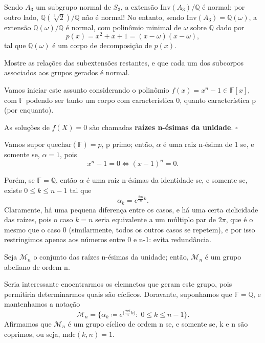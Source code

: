 \documentclass[../algebraIII_notes.tex]{subfiles}
\begin{document}
\begin{example}
	Sendo \(A_3\) um subgrupo normal de \(S_3\), a extensão \(\mathrm{Inv}(A_3)/\mathbb{Q}\) é normal; por outro lado, \(\mathbb{Q}(\sqrt[3]{2})/\mathbb{Q}\) não é normal!
	No entanto, sendo \(\mathrm{Inv}(A_3)= \mathbb{Q}(\omega)\), a extensão \(\mathbb{Q}(\omega )/\mathbb{Q}\) é normal, com polinômio minimal de \(\omega \) sobre \(\mathbb{Q}\) dado por
	\[
		p(x) = x^{2}+x+1 = (x-\omega )(x-\overline{\omega }),
	\]
	tal que \(\mathbb{Q}(\omega)\) é um corpo de decomposição de \(p(x)\).
\end{example}
\begin{exr}
	Mostre as relações das subextensões restantes, e que cada um dos subcorpos associados aos grupos gerados é normal.
\end{exr}

Vamos iniciar este assunto considerando o polinômio \(f(x)=x^{n}-1\in \mathbb{F}[x]\), com \(\mathbb{F}\) podendo ser tanto um corpo com característica 0, quanto característica p (por enquanto).
\begin{def*}
	As soluções de \(f(X) = 0\) são chamadas \textbf{raízes n-ésimas da unidade}. \(\square\)
\end{def*}
\begin{example}
	Vamos supor que\linebreak\(\mathrm{char}(\mathbb{F}) = p\), p primo; então, \(\alpha \) é uma raiz n-ésima de 1 se, e somente se, \(\alpha =1\), pois
	\[
		x^{n}-1=0 \Longleftrightarrow (x-1)^{n} = 0.
	\]

	Porém, se \(\mathbb{F} = \mathbb{Q}\), então \(\alpha \) é uma raiz n-ésimas da identidade se, e somente se, existe \(0\leq k\leq n-1\) tal que
	\[
		\alpha_{k}= e^{\frac{2\pi i}{n}k}.
	\]
	Claramente, há uma pequena diferença entre os casos, e há uma certa ciclicidade das raízes, pois o caso \(k=n\) seria equivalente a um múltiplo par de \(2\pi \), que é o mesmo que o caso \(0\) (similarmente, todos os outros casos se repetem), e por isso restringimos apenas aos números entre 0 e n-1: evita redundância.
\end{example}
\begin{lemma*}
	Seja \(\mathcal{M}_{n}\) o conjunto das raízes n-ésimas da unidade; então, \(\mathcal{M}_{n}\) é um grupo abeliano de ordem n.
\end{lemma*}
Seria interessante enocntrarmos os elemnetos que geram este grupo, pois permitiria determinarmos quais são cíclicos. Doravante, suponhamos que \(\mathbb{F} = \mathbb{Q}\), e mantenhamos a notação
\[
	\mathcal{M}_{n} = \biggl\{\alpha_{k} \coloneqq e^{\biggl(\frac{2\pi i}{n}k\biggr)}:\; 0\leq k\leq n-1\biggr\}.
\]
Afirmamos que \(\mathcal{M}_{n}\) é um grupo cíclico de ordem n se, e somente se, k e n são coprimos, ou seja, \(\mathrm{mdc}(k, n) = 1\).
\end{document}

